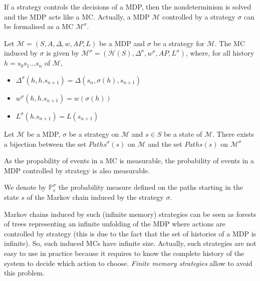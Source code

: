 If a strategy controls the decisions of a MDP, then the nondeterminism is solved
and the MDP acts like a MC. Actually, a MDP $\mathcal{M}$ controlled by a strategy $\sigma$ can be formalised as a MC $\mathcal{M}^\sigma$.

\begin{definition}
Let $\mathcal{M} = (S, A, \Delta, w, AP, L)$ be a MDP and $\sigma$ be a strategy for
$\mathcal{M}$. The MC induced by $\sigma$ is given by
$ \mathcal{M}^\sigma = (\mathcal{H}(S), \Delta^\sigma, w^\sigma, AP, L^\sigma) $, where, for all history
$h = s_0 s_1 \dots s_n$ of $\mathcal{M}$,
\begin{itemize}
\item $\Delta^\sigma(h, h . s_{n+1}) = \Delta(s_n, \sigma(h), s_{n+1})$
\item $w^\sigma(h, h . s_{n+1}) = w(\sigma(h))$
\item $L^\sigma(h . s_{n+1}) = L(s_{n+1})$
\end{itemize}
\end{definition}

\begin{property}
  Let $\mathcal{M}$ be a MDP, $\sigma$ be a strategy on $\mathcal{M}$ and $s\in S$ be a state of $\mathcal{M}$. There exists a bijection between the
  set $Paths^\sigma(s)$ on $\mathcal{M}$ and the set $Paths(s)$ on $\mathcal{M}^\sigma$
\end{property}

As the propability of events in a MC is measurable, the probability of events in a MDP controlled by strategy is also measurable.
\begin{notation}
  We denote by $\mathbb{P}_s^\sigma$ the probability measure defined on the paths starting in the state $s$ of the Markov chain induced by the strategy $\sigma$.
\end{notation}

Markov chains induced by such (infinite memory) strategies can be seen as forests of trees representing an infinite unfolding of the MDP where actions are controlled by strategy (this is due to the fact that the set of histories of a MDP is infinite). So, such induced MCs have infinite size. Actually, such strategies are not easy to use in practice because it requires to
know the complete history of the system to decide which action to choose. \textit{Finite memory strategies} allow to avoid this problem.

